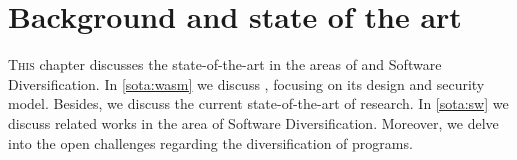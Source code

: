 \chapter{Background and state of the art}
\label{SOTA}



\lettrine[lines=3]{T}{his} chapter discusses the state-of-the-art in the areas of \Wasm and Software Diversification. 
In \autoref{sota:wasm} we discuss \Wasm, focusing on its design and security model.
Besides, we discuss the current state-of-the-art of \Wasm research.
In \autoref{sota:sw} we discuss related works in the area of Software Diversification.
Moreover, we delve into the open challenges regarding the diversification of \Wasm programs.






